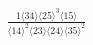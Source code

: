 \documentclass[varwidth, border=5pt]{standalone}
\begin{document}
\begin{my}
$\begin{gathered}
\scriptscriptstyle\frac{1⟨34⟩⟨25⟩^3⟨15⟩}{⟨14⟩^2⟨23⟩⟨24⟩⟨35⟩^2}
\end{gathered}$
\end{my}
\end{document}
